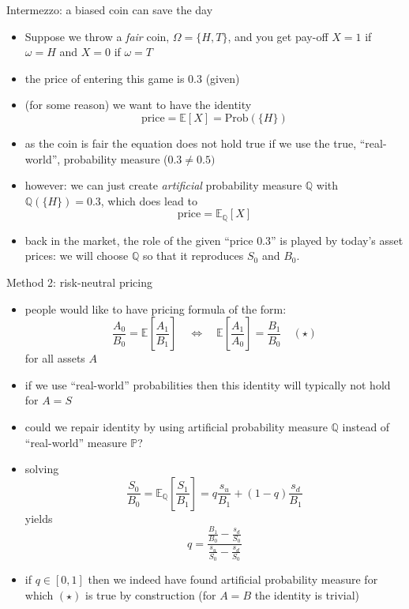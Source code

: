 \documentclass[pdf, handout]{beamer}
\begin{document}
\begin{frame}{Intermezzo:  a biased coin can save the day} 
\begin{itemize}
\item
Suppose we throw a \emph{fair} coin, $\Omega=\{H,T\}$, and you get
pay-off $X=1$ if $\omega=H$ and $X=0$ if $\omega=T$
\item the price of entering this game is 0.3 (given)
\item (for some reason) we want to have the identity
\[
\text{price} = \mathbb{E}[ X] = \text{Prob}(\{H\})
\]
\item as the coin is fair the equation does not hold true if we use the true, ``real-world'',  probability measure ($0.3\neq 0.5)$
\item however: we can just create \emph{artificial} probability measure
$\mathbb{Q}$ with $\mathbb{Q}(\{H\})=0.3$, which does lead to
\[
\text{price} = \mathbb{E}_{\mathbb{Q}}[X]
\]
\item back in the market, the role of the given ``price $0.3$'' is played by today's asset prices: we will choose $\mathbb{Q}$ so that it reproduces $S_0$ and $B_0$.
\end{itemize}
\end{frame}

\begin{frame}{Method 2: risk-neutral pricing}
\begin{itemize}
\item  people would like to have pricing formula of the form:
\[
\frac{A_0}{B_0} = \mathbb{E}\left[ \frac{A_1}{B_1} \right]\quad   
\Longleftrightarrow\quad
 \mathbb{E}\left[ \frac{A_1}{A_0} \right] =\frac{B_1}{B_0}\quad (\star)
\]
for all assets $A$
\item if we use ``real-world'' probabilities then this identity will
typically not hold for $A=S$
\item could we repair identity by using artificial probability measure $\mathbb{Q}$ instead of ``real-world'' measure $\mathbb{P}$?
\item solving
\[
\frac{S_0}{B_0}=\mathbb{E}_{\mathbb{Q}}
\left[ \frac{S_1}{B_1}\right] = q \frac{s_u}{B_1}  +(1-q) \frac{s_d}{B_1}
\]
yields
\[
q=\frac{\frac{B_1}{B_0}-\frac{s_d}{S_0}    }{ \frac{s_u}{S_0}-\frac{s_d}{S_0}  }
\]
\item if $q\in [0,1]$ then we indeed have found 
artificial probability measure for which $(\star)$ is true by construction
(for $A=B$ the identity is trivial)
\end{itemize}
\end{frame}
\end{document}

